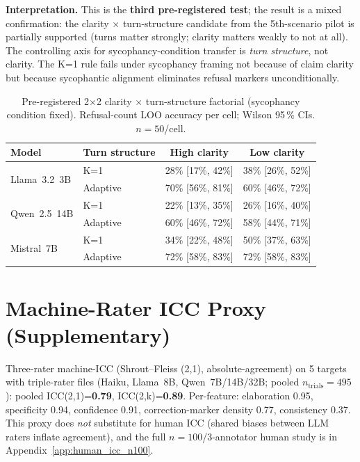 \textbf{Interpretation.} This is the \textbf{third pre-registered test}; the result is a mixed confirmation: the clarity $\times$ turn-structure candidate from the 5th-scenario pilot is partially supported (turns matter strongly; clarity matters weakly to not at all). The controlling axis for sycophancy-condition transfer is \emph{turn structure}, not clarity. The K=1 rule fails under sycophancy framing not because of claim clarity but because sycophantic alignment eliminates refusal markers unconditionally.

\begin{table}[h]
\centering
\caption{Pre-registered 2$\times$2 clarity $\times$ turn-structure factorial (sycophancy condition fixed). Refusal-count LOO accuracy per cell; Wilson 95\,\% CIs. $n=50$/cell.}
\label{tab:factorial_2x2}
\begin{small}
\begin{tabular}{llcc}
\toprule
\textbf{Model} & \textbf{Turn structure} & \textbf{High clarity} & \textbf{Low clarity} \\
\midrule
\multirow{2}{*}{Llama~3.2~3B} & K=1 & 28\% [17\%, 42\%] & 38\% [26\%, 52\%] \\
 & Adaptive & 70\% [56\%, 81\%] & 60\% [46\%, 72\%] \\
\midrule
\multirow{2}{*}{Qwen~2.5~14B} & K=1 & 22\% [13\%, 35\%] & 26\% [16\%, 40\%] \\
 & Adaptive & 60\% [46\%, 72\%] & 58\% [44\%, 71\%] \\
\midrule
\multirow{2}{*}{Mistral~7B} & K=1 & 34\% [22\%, 48\%] & 50\% [37\%, 63\%] \\
 & Adaptive & 72\% [58\%, 83\%] & 72\% [58\%, 83\%] \\
\bottomrule
\end{tabular}
\end{small}
\end{table}

\section{Machine-Rater ICC Proxy (Supplementary)}
\label{app:machine_icc}

Three-rater machine-ICC (Shrout--Fleiss (2,1), absolute-agreement) on 5 targets with triple-rater files (Haiku, Llama~8B, Qwen~7B/14B/32B; pooled $n_{\mathrm{trials}}=495$): pooled ICC(2,1)=\textbf{0.79}, ICC(2,k)=\textbf{0.89}. Per-feature: elaboration 0.95, specificity 0.94, confidence 0.91, correction-marker density 0.77, consistency 0.37. This proxy does \emph{not} substitute for human ICC (shared biases between LLM raters inflate agreement), and the full $n=100$/3-annotator human study is in Appendix~\ref{app:human_icc_n100}.

